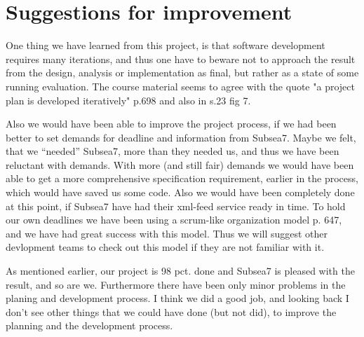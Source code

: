 \section{Suggestions for improvement}
    One thing we have learned from this project, is that software development
    requires many iterations, and thus one have to beware not to approach
    the result from the design, analysis or implementation as final, but rather
    as a state of some running evaluation. The course material seems to agree
    with the quote "a project plan is developed iteratively"\cite{oose} p.698
    and also in \cite{mad-article} s.23 fig 7.

    Also we would have been able to improve the project process, if we had been
    better to set demands for deadline and information from Subsea7. Maybe we
    felt, that we ``needed'' Subsea7, more than they needed us, and thus we
    have been reluctant with demands. With more (and still fair) demands we
    would have been able to get a more comprehensive specification requirement,
    earlier in the process, which would have saved us some code. Also we would
    have been completely done at this point, if Subsea7 have had their xml-feed
    service ready in time. To hold our own deadlines we have been using a
    scrum-like organization model \cite{oose} p. 647, and we have had great
    success with this model. Thus we will suggest other devlopment teams to
    check out this model if they are not familiar with it.

    As mentioned earlier, our project is 98 pct. done and Subsea7 is pleased
    with the result, and so are we. Furthermore there have been only minor
    problems in the planing and development process. I think we did a good job,
    and looking back I don't see other things that we could have done (but not
    did), to improve the planning and the development process.
